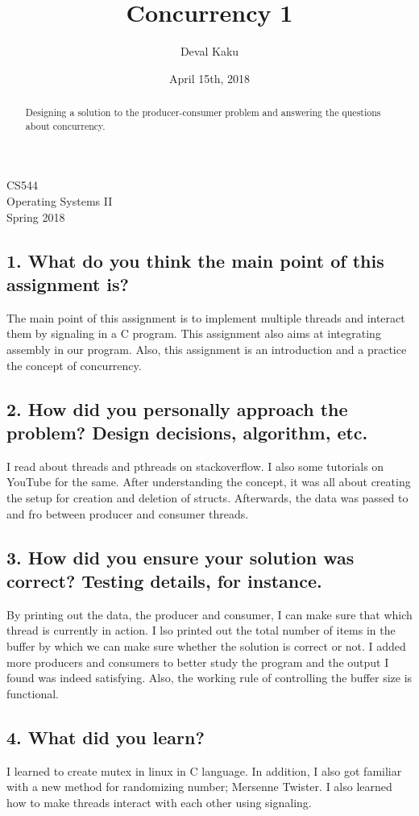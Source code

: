 \documentclass[english,10pt,letterpaper,onecolumn]{IEEEtran}
\title{Concurrency 1}
\author{
  Deval Kaku
}
\date{April 15th, 2018}
\begin{document}
\begin{titlepage} 
\maketitle
\begin{center}
CS544\\
Operating Systems II\\
Spring 2018
\vspace{50 mm}
\end{center}

\begin{abstract}
Designing a solution to the producer-consumer problem and answering the questions about concurrency.
\end{abstract}
\end{titlepage}

\clearpage
\subsection*{\bf 1. What do you think the main point of this assignment is?}
The main point of this assignment is to implement multiple threads and interact them by signaling in a C program. This assignment also aims at integrating assembly in our program. Also, this assignment is an introduction and a practice the concept of concurrency.

\subsection*{\bf 2. How did you personally approach the problem? Design decisions, algorithm, etc.}
I read about threads and pthreads on stackoverflow. I also some tutorials on YouTube for the same. After understanding the concept, it was all about creating the setup for creation and deletion of structs.  Afterwards, the data was passed to and fro between producer and consumer threads.

\subsection*{\bf 3. How did you ensure your solution was correct? Testing details, for instance.}
By printing out the data, the producer and consumer, I can make sure that which thread is currently in action. I lso printed out the total number of items in the buffer by which we can make sure whether the solution is correct or not. I added more producers and consumers to better study the program and the output I found was indeed satisfying. Also, the working rule of controlling the buffer size is functional. 

\subsection*{\bf 4. What did you learn?}
I learned to create mutex in linux in C language. In addition, I also got familiar with a new method for randomizing number; Mersenne Twister. I also learned how to make threads interact with each other using signaling.
\end{document}

